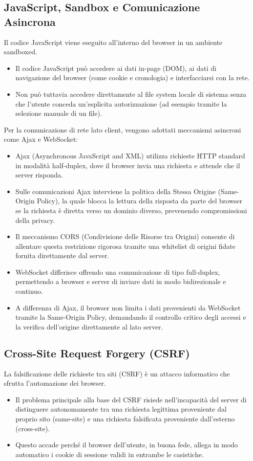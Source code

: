 \documentclass{article}
\begin{document}
\subsection{JavaScript, Sandbox e Comunicazione Asincrona}
Il codice JavaScript viene eseguito all'interno del browser in un ambiente sandboxed.
\begin{itemize}
    \item Il codice JavaScript può accedere ai dati in-page (DOM), ai dati di navigazione del browser (come cookie e cronologia) e interfacciarsi con la rete.
    \item Non può tuttavia accedere direttamente al file system locale di sistema senza che l'utente conceda un'esplicita autorizzazione (ad esempio tramite la selezione manuale di un file).
\end{itemize}

Per la comunicazione di rete lato client, vengono adottati meccanismi asincroni come Ajax e WebSocket:
\begin{itemize}
    \item Ajax (Asynchronous JavaScript and XML) utilizza richieste HTTP standard in modalità half-duplex, dove il browser invia una richiesta e attende che il server risponda.
    \item Sulle comunicazioni Ajax interviene la politica della Stessa Origine (Same-Origin Policy), la quale blocca la lettura della risposta da parte del browser se la richiesta è diretta verso un dominio diverso, prevenendo compromissioni della privacy.
    \item Il meccanismo CORS (Condivisione delle Risorse tra Origini) consente di allentare questa restrizione rigorosa tramite una whitelist di origini fidate fornita direttamente dal server.
    \item WebSocket differisce offrendo una comunicazione di tipo full-duplex, permettendo a browser e server di inviare dati in modo bidirezionale e continuo.
    \item A differenza di Ajax, il browser non limita i dati provenienti da WebSocket tramite la Same-Origin Policy, demandando il controllo critico degli accessi e la verifica dell'origine direttamente al lato server.
\end{itemize}

\subsection{Cross-Site Request Forgery (CSRF)}
La falsificazione delle richieste tra siti (CSRF) è un attacco informatico che sfrutta l'automazione dei browser.
\begin{itemize}
    \item Il problema principale alla base del CSRF risiede nell'incapacità del server di distinguere autonomamente tra una richiesta legittima proveniente dal proprio sito (same-site) e una richiesta falsificata proveniente dall'esterno (cross-site).
    \item Questo accade perché il browser dell'utente, in buona fede, allega in modo automatico i cookie di sessione validi in entrambe le casistiche.
\end{itemize}
\end{document}

